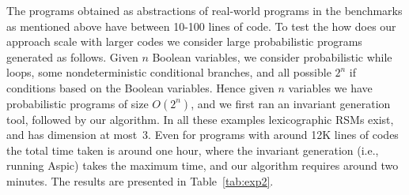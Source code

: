 \smallskip{} 
The programs obtained as abstractions of real-world programs in the benchmarks 
as mentioned above have between 10-100 lines of code. 
To test the how does our approach scale with larger codes we consider large
probabilistic programs generated as follows.
Given $n$ Boolean variables, we consider probabilistic while loops,
some nondeterministic conditional branches, and all possible $2^n$ if conditions
based on the Boolean variables. 
Hence given $n$ variables we have probabilistic programs of size $O(2^n)$, and 
we first ran an invariant generation tool, followed by our algorithm.
In all these examples lexicographic RSMs exist, and has dimension at most~3.
Even for programs with around 12K lines of codes the total time taken is around 
one hour, where the invariant generation (i.e., running Aspic) takes the maximum time, 
and our algorithm requires around two minutes.
The results are presented in Table~\ref{tab:exp2}.






